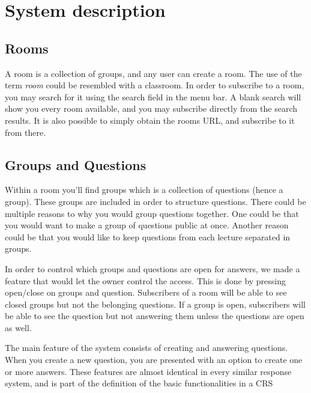 \section{System description}
\subsection{Rooms}
A room is a collection of groups, and any user can create a room. The use of the term \emph{room} could be resembled with a classroom. In order to subscribe to a room, you may search for it using the search field in the menu bar. A blank search will show you every room available, and you may subscribe directly from the search results. It is also possible to simply obtain the rooms URL, and subscribe to it from there.


\subsection{Groups and Questions}
Within a room you'll find groups which is a collection of questions (hence a group). These groups are included in order to structure questions. There could be multiple reasons to why you would group questions together. One could be that you would want to make a group of questions public at once. Another reason could be that you would like to keep questions from each lecture separated in groups.

In order to control which groups and questions are open for answers, we made a feature that would let the owner control the access. This is done by pressing open/close on groups and question. Subscribers of a room will be able to see closed groups but not the belonging questions. If a group is open, subscribers will be able to see the question but not answering them unless the questions are open as well.

The main feature of the system consists of creating and answering questions. When you create a new question, you are presented with an option to create one or more answers.
These features are almost identical in every similar response system, and is part of the definition of the basic functionalities in a CRS 

